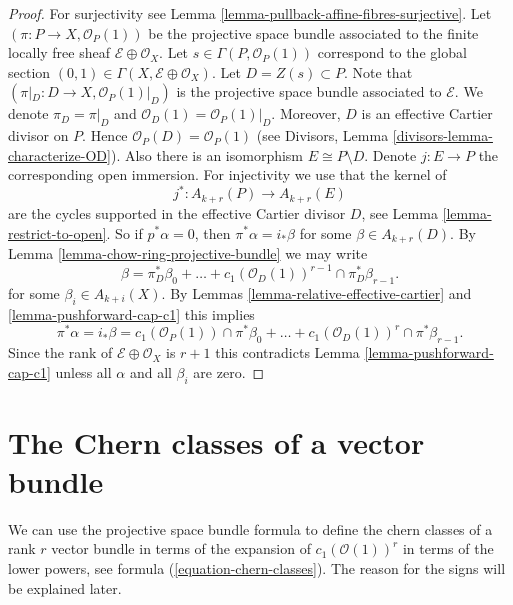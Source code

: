 \begin{proof}
For surjectivity see Lemma \ref{lemma-pullback-affine-fibres-surjective}.
Let $(\pi  : P \to X, \mathcal{O}_P(1))$
be the projective space bundle associated
to the finite locally free sheaf $\mathcal{E} \oplus \mathcal{O}_X$.
Let $s \in \Gamma(P, \mathcal{O}_P(1))$ correspond to the global
section $(0, 1) \in \Gamma(X, \mathcal{E} \oplus \mathcal{O}_X)$.
Let $D = Z(s) \subset P$. Note that
$(\pi|_D : D \to X , \mathcal{O}_P(1)|_D)$
is the projective space bundle associated
to $\mathcal{E}$. We denote $\pi_D = \pi|_D$ and
$\mathcal{O}_D(1) = \mathcal{O}_P(1)|_D$.
Moreover, $D$ is an effective
Cartier divisor on $P$. Hence $\mathcal{O}_P(D) = \mathcal{O}_P(1)$
(see Divisors, Lemma \ref{divisors-lemma-characterize-OD}).
Also there is an isomorphism
$E \cong P \setminus D$. Denote $j : E \to P$ the
corresponding open immersion.
For injectivity we use that the kernel of
$$
j^* :
A_{k + r}(P)
\longrightarrow
A_{k + r}(E)
$$
are the cycles supported in the effective Cartier divisor $D$,
see Lemma \ref{lemma-restrict-to-open}. So if $p^*\alpha = 0$, then
$\pi^*\alpha = i_*\beta$ for some $\beta \in A_{k + r}(D)$.
By Lemma \ref{lemma-chow-ring-projective-bundle} we may write
$$
\beta = \pi_D^*\beta_0 +
\ldots + c_1(\mathcal{O}_D(1))^{r - 1} \cap \pi_D^* \beta_{r - 1}.
$$
for some $\beta_i \in A_{k + i}(X)$.
By Lemmas \ref{lemma-relative-effective-cartier}
and \ref{lemma-pushforward-cap-c1}
this implies
$$
\pi^*\alpha = i_*\beta =
c_1(\mathcal{O}_P(1)) \cap \pi^*\beta_0 +
\ldots +
c_1(\mathcal{O}_D(1))^r \cap \pi^*\beta_{r - 1}.
$$
Since the rank of $\mathcal{E} \oplus \mathcal{O}_X$ is $r + 1$
this contradicts Lemma \ref{lemma-pushforward-cap-c1} unless all
$\alpha$ and all $\beta_i$ are zero.
\end{proof}








\section{The Chern classes of a vector bundle}
\label{section-chern-classes-vector-bundles}

\noindent
We can use the projective space bundle formula to define the
chern classes of a rank $r$ vector bundle in terms of the expansion
of $c_1(\mathcal{O}(1))^r$ in terms of the lower powers, see
formula (\ref{equation-chern-classes}).
The reason for the signs will be explained later.

